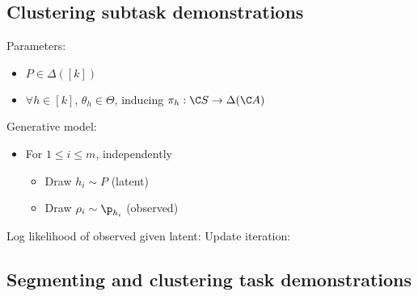 \subsection{Clustering subtask demonstrations}

Parameters:
\begin{itemize}
	\item $P\in\Delta([k])$
	\item $\forall h\in[k]$, $\theta_h\in\Theta$, inducing $\pi_h:\C S\to\Delta(\C A)$
\end{itemize}
Generative model:
\begin{itemize}
	\item For $1\le i\le m$, independently
	\begin{itemize}
		\item Draw $h_i\sim P$ (latent)
		\item Draw $\rho_i\sim\p_{h_i}$ (observed)
	\end{itemize}
\end{itemize}
Log likelihood of observed given latent:
Update iteration:

\subsection{Segmenting and clustering task demonstrations}


